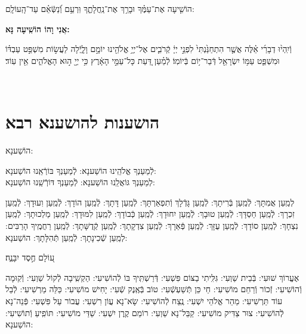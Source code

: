 \documentclass[twoside, openany, parskip=half, 11pt]{book}
\begin{document}
הוֹשִׁ֤יעָה אֶת־עַמֶּ֗ךָ וּבָרֵ֥ךְ אֶת־נַֽחֲלָתֶ֑ךָ וּֽרְעֵ֥ם וְֿ֝נַשְּֿׂאֵ֗ם עַד־הָֽעוֹלָֽם:


\begin{large}
	\textbf{אֲנִי וָהוֹ הוֹשִֽׁיעָה נָּא:}
\end{large}

וְֿיִֽהְי֨וּ דְבָרַ֜י אֵ֗לֶּה אֲשֶׁ֤ר הִתְחַנַּ֙נְתִּי֙ לִפְנֵ֣י יְיָ֔ קְֿרֹבִ֛ים אֶל־יְיָ֥ אֱלֹהֵ֖ינוּ יוֹמָ֣ם וָלָ֑יְֿלָה לַעֲשׂ֣וֹת מִשְׁפַּ֣ט עַבְדּ֗וֹ וּמִשְׁפַּ֛ט עַמּ֥וֹ יִשְׂרָאֵ֖ל דְּֿבַר־י֥וֹם בְּֿיוֹמֽוֹ׃ לְֿמַ֗עַן דַּ֚עַת כָּל־עַמֵּ֣י הָאָ֔רֶץ כִּ֥י יְיָ֖ ה֣וּא הָאֱלֹהִ֑ים אֵ֖ין עֽוֹד׃

\vfill
{}\\

\clearpage

\vspace{-1\baselineskip}
\section[הושענות להושענא רבא]{ הושענות להושענא רבא }

\begin{Large}
	הוֹשַׁענָא:
\end{Large}


לְֿמַעַנְךָ אֱלֹהֵֽינוּ הוֹשַׁענָא: לְֿמַעַנְךָ בּוֹרְֿאֵֽנוּ הוֹשַׁענָא:\\
לְמַעַנְךָ גּוֹאֲלֵֽנוּ הוֹשַׁענָא: לְֿמַעַנְךָ דּוֹרְֿשֵֽׁנוּ הוֹשַׁענָא:

לְמַֽעַן אֲמִתָּךְ: לְֿמַֽעַן בְּֿרִיתָךְ: לְֿמַֽעַן גָּדְֿלָךְ וְֿתִפְאַרְתָּךְ: לְֿמַֽעַן דָּתָךְ: לְֿמַֽעַן הוֹדָךְ: לְֿמַֽעַן וִעוּדָךְ: לְֿמַֽעַן זִכְרָךְ: לְֿמַֽעַן חַסְדָּךְ: לְֿמַֽעַן טוּבָךְ: לְֿמַֽעַן יִחוּדָךְ: לְֿמַֽעַן כְּֿבוֹדָךְ: לְֿמַֽעַן לִמּוּדָךְ: לְֿמַֽעַן מַלְכוּתָךְ: לְֿמַֽעַן נִצְחָךְ: לְֿמַֽעַן סוֹדָךְ: לְֿמַֽעַן עֻזָּךְ: לְֿמַֽעַן פְּֿאֵרָךְ: לְֿמַֽעַן צִדְקָתָךְ: לְֿמַֽעַן קְֿדֻשָּׁתָךְ: לְֿמַֽעַן רַחֲמֶֽיךָ הָרַבִּים:
לְמַֽעַן שְֿׁכִינָתָךְ:
לְֿמַֽעַן תְּֿהִלָּתָךְ: הוֹשַׁענָא:

ע֭וֹלָם חֶ֣סֶד יִבָּנֶ֑ה׃

אֶעֱרוֹךְ שׁוּעִי: בְּֿבֵית שַׁוְעִי: גִּלִּֽיתִי בַצּוֹם פִּשְׁעִי: דְּֿרַשְׁתִּֽיךָ בּוֹ לְֿהוֹשִׁיעִי: הַקְשִֽׁיבָה לְֿקוֹל שַׁוְעִי: וְֿקֽוּמָה וְֿהוֹשִׁיעִי: זְֿכוֹר וְֿרַחֵם מוֹשִׁיעִי: חַי כֵּן תְּֿשַׁעְשְֿׁעִי: טוֹב בְּֿאֶֽנֶק שְֿׁעִי: יָחִישׁ מוֹשִׁיעִי: כַּלֵּה מַרְשִׁיעִי: לְֿבַל עוֹד תַּרְשִׁיעִי: מַהֵר אֱלֹהֵי יִשְׁעִי: נֶֽצַח לְֿהוֹשִׁיעִי: שָׂא־נָא עֲוֹן רִשְׁעִי: עֲבוֹר עַל פִּשְׁעִי: פְּֿנֵה־נָא לְֿהוֹשִׁיעִי: צוּר צַדִּיק מוֹשִׁיעִי: קַבֵּל־נָא שַׁוְעִי: רוֹמֵם קֶֽרֶן יִשְׁעִי:
שַׁדַּי מוֹשִׁיעִי:
תּוֹפִֽיעַ וְֿתוֹשִׁיעִי: הוֹשַׁענָא:
\end{document}
